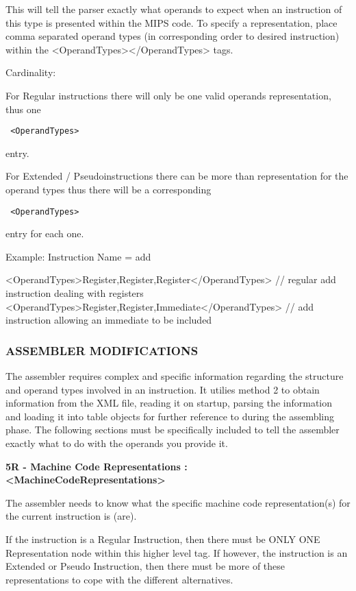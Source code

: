 \documentclass[12pt]{report}
\begin{document}
This will tell the parser exactly what operands to expect when an instruction of this type is presented within the MIPS code. To specify a representation, place comma separated operand types (in corresponding order to desired instruction) within the <OperandTypes></OperandTypes> tags.

Cardinality:

\begin{list}
\item For Regular instructions there will only be one valid operands representation, thus one \begin{verbatim} <OperandTypes> \end{verbatim} entry.
\item For Extended / Pseudoinstructions there can be more than representation for the operand types thus there will be a corresponding \begin{verbatim} <OperandTypes> \end{verbatim}entry for each one.
\end{list}

Example: Instruction Name = add

<OperandTypes>Register,Register,Register</OperandTypes>		// regular add instruction dealing with registers
<OperandTypes>Register,Register,Immediate</OperandTypes>	// add instruction allowing an immediate to be included


\subsubsection{ASSEMBLER MODIFICATIONS}

The assembler requires complex and specific information regarding the structure and operand types involved in an instruction. It utilies method 2 to obtain information from the XML file, reading it on startup, parsing the information and loading it into table objects for further reference to during the assembling phase. The following sections must be specifically included to tell the assembler exactly what to do with the operands you provide it.


\textbf{5R - Machine Code Representations : <MachineCodeRepresentations> }

The assembler needs to know what the specific machine code representation(s) for the current instruction is (are).

If the instruction is a Regular Instruction, then there must be ONLY ONE Representation node within this higher level tag. If however, the instruction is an Extended or Pseudo Instruction, then there must be more of these representations to cope with the different alternatives.
\end{document}
